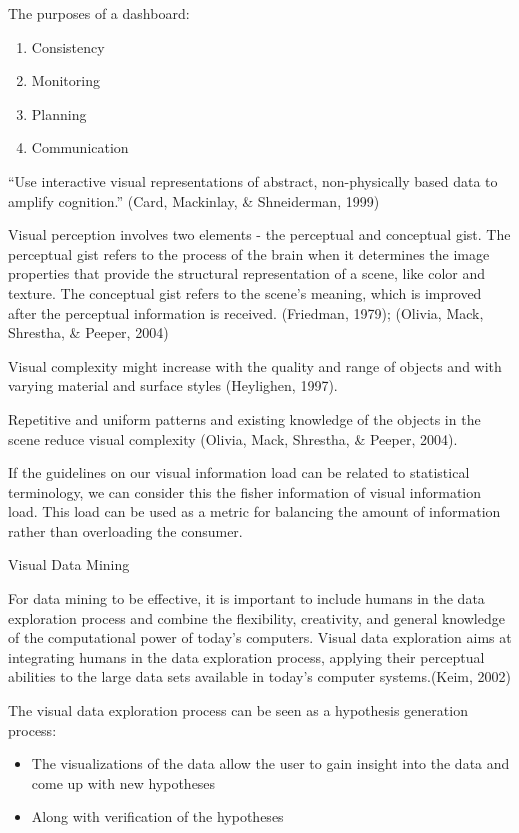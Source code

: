 \documentclass[print]{nuthesis}
\providecommand{\tightlist}{%
  \setlength{\itemsep}{0pt}\setlength{\parskip}{0pt}}
\begin{document}
The purposes of a dashboard:

\begin{enumerate}
\def\labelenumi{\arabic{enumi}.}
\tightlist
\item
  Consistency
\item
  Monitoring
\item
  Planning
\item
  Communication
\end{enumerate}

``Use interactive visual representations of abstract, non-physically based data to amplify cognition.'' (Card, Mackinlay, \& Shneiderman, 1999)

Visual perception involves two elements - the perceptual and conceptual gist. The perceptual gist refers to the process of the brain when it determines the image properties that provide the structural representation of a scene, like color and texture. The conceptual gist refers to the scene's meaning, which is improved after the perceptual information is received. (Friedman, 1979); (Olivia, Mack, Shrestha, \& Peeper, 2004)

Visual complexity might increase with the quality and range of objects and with varying material and surface styles (Heylighen, 1997).

Repetitive and uniform patterns and existing knowledge of the objects in the scene reduce visual complexity (Olivia, Mack, Shrestha, \& Peeper, 2004).

If the guidelines on our visual information load can be related to statistical terminology, we can consider this the fisher information of visual information load. This load can be used as a metric for balancing the amount of information rather than overloading the consumer.

Visual Data Mining

For data mining to be effective, it is important to include humans in the data exploration process and combine the flexibility, creativity, and general knowledge of the computational power of today's computers. Visual data exploration aims at integrating humans in the data exploration process, applying their perceptual abilities to the large data sets available in today's computer systems.(Keim, 2002)

The visual data exploration process can be seen as a hypothesis generation process:

\begin{itemize}
\tightlist
\item
  The visualizations of the data allow the user to gain insight into the data and come up with new hypotheses
\item
  Along with verification of the hypotheses
\end{itemize}
\end{document}
